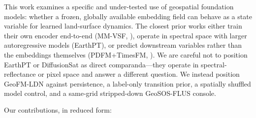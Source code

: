 \documentclass{article}
\begin{document}
This work examines a specific and under-tested use of geospatial foundation models: whether a frozen, globally available embedding field can behave as a state variable for learned land-surface dynamics. The closest prior works either train their own encoder end-to-end (MM-VSF, \citealt{mmvsf2024}), operate in spectral space with larger autoregressive models (EarthPT), or predict downstream variables rather than the embeddings themselves (PDFM+TimesFM, \citealt{google2024pdfm}). We are careful not to position EarthPT or DiffusionSat as direct comparanda---they operate in spectral-reflectance or pixel space and answer a different question. We instead position GeoFM-LDN against persistence, a label-only transition prior, a spatially shuffled model control, and a same-grid stripped-down GeoSOS-FLUS console.

Our contributions, in reduced form:
\end{document}
